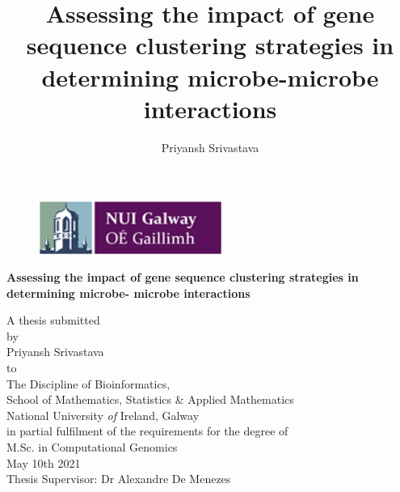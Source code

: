 \documentclass[a4paper, 12pt]{report}
\title{Assessing the impact of gene sequence clustering strategies in
determining microbe-microbe interactions}
\author{Priyansh Srivastava}
\begin{document}
\begin{titlepage}
\setlength{\topmargin}{-0.6in}

\begin{figure}[!h]
  \centering
  \includegraphics[width=6cm]{logo.png}
\end{figure}
\vspace{1cm}

\begin{center}
{\LARGE \bigskip\textbf{Assessing the impact of gene sequence clustering strategies in determining microbe-
microbe interactions}}

\vspace{1.25cm}
{\normalsize A thesis submitted \vspace{.5cm}\\ by \vspace{.5cm}\\
\vspace{1.25cm} Priyansh Srivastava \vspace{1.25cm} \\ to \vspace{.5cm} \\
The Discipline of Bioinformatics, \\ School of Mathematics, Statistics \& Applied Mathematics \\ National University \textit{of} Ireland, Galway \vspace{1cm} \\ in partial fulfilment of
the requirements for the degree of \\ \vspace{.5cm} M.Sc. in
Computational Genomics \vspace{1cm} \\ May 10th 2021 \\
\vspace{1.25cm} Thesis Supervisor: Dr Alexandre De Menezes}

\end{center}
\end{titlepage}



 \setcounter{page}{2}
\tableofcontents
\newpage

\listoffigures
\begingroup
\let\clearpage\relax
\listoftables
\endgroup













\end{document}
